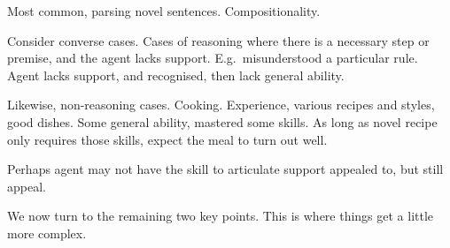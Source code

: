 \begin{note}
  Most common, parsing novel sentences.
  Compositionality.

  Consider converse cases.
  Cases of reasoning where there is a necessary step or premise, and the agent lacks support.
  E.g.\ misunderstood a particular rule.
  Agent lacks support, and recognised, then lack general ability.

  Likewise, non-reasoning cases.
  Cooking.
  Experience, various recipes and styles, good dishes.
  Some general ability, mastered some skills.
  As long as novel recipe only requires those skills, expect the meal to turn out well.

  Perhaps agent may not have the skill to articulate support appealed to, but still appeal.
\end{note}

\begin{note}
  We now turn to the remaining two key points.
  This is where things get a little more complex.
\end{note}


